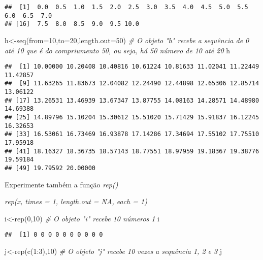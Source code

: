\documentclass[
]{book}
\newenvironment{Shaded}{\begin{snugshade}}{\end{snugshade}}
\newcommand{\AttributeTok}[1]{\textcolor[rgb]{0.77,0.63,0.00}{#1}}
\newcommand{\CommentTok}[1]{\textcolor[rgb]{0.56,0.35,0.01}{\textit{#1}}}
\newcommand{\DecValTok}[1]{\textcolor[rgb]{0.00,0.00,0.81}{#1}}
\newcommand{\FunctionTok}[1]{\textcolor[rgb]{0.00,0.00,0.00}{#1}}
\newcommand{\NormalTok}[1]{#1}
\newcommand{\OtherTok}[1]{\textcolor[rgb]{0.56,0.35,0.01}{#1}}
\newcommand{\SpecialCharTok}[1]{\textcolor[rgb]{0.00,0.00,0.00}{#1}}
\begin{document}
\begin{verbatim}
##  [1]  0.0  0.5  1.0  1.5  2.0  2.5  3.0  3.5  4.0  4.5  5.0  5.5  6.0  6.5  7.0
## [16]  7.5  8.0  8.5  9.0  9.5 10.0
\end{verbatim}

\begin{Shaded}
\begin{Highlighting}[]
\NormalTok{h}\OtherTok{\textless{}{-}}\FunctionTok{seq}\NormalTok{(}\AttributeTok{from=}\DecValTok{10}\NormalTok{,}\AttributeTok{to=}\DecValTok{20}\NormalTok{,}\AttributeTok{length.out=}\DecValTok{50}\NormalTok{) }\CommentTok{\# O objeto "h" recebe a sequência de 0 até 10 que é do compriumento 50, ou seja, há 50 número de 10 até 20}
\NormalTok{h}
\end{Highlighting}
\end{Shaded}

\begin{verbatim}
##  [1] 10.00000 10.20408 10.40816 10.61224 10.81633 11.02041 11.22449 11.42857
##  [9] 11.63265 11.83673 12.04082 12.24490 12.44898 12.65306 12.85714 13.06122
## [17] 13.26531 13.46939 13.67347 13.87755 14.08163 14.28571 14.48980 14.69388
## [25] 14.89796 15.10204 15.30612 15.51020 15.71429 15.91837 16.12245 16.32653
## [33] 16.53061 16.73469 16.93878 17.14286 17.34694 17.55102 17.75510 17.95918
## [41] 18.16327 18.36735 18.57143 18.77551 18.97959 19.18367 19.38776 19.59184
## [49] 19.79592 20.00000
\end{verbatim}

Experimente também a função \emph{rep()}

\emph{\emph{rep(x, times = 1, length.out = NA, each = 1)}}

\begin{Shaded}
\begin{Highlighting}[]
\NormalTok{i}\OtherTok{\textless{}{-}}\FunctionTok{rep}\NormalTok{(}\DecValTok{0}\NormalTok{,}\DecValTok{10}\NormalTok{) }\CommentTok{\# O objeto "i" recebe 10 números 1}
\NormalTok{i}
\end{Highlighting}
\end{Shaded}

\begin{verbatim}
##  [1] 0 0 0 0 0 0 0 0 0 0
\end{verbatim}

\begin{Shaded}
\begin{Highlighting}[]
\NormalTok{j}\OtherTok{\textless{}{-}}\FunctionTok{rep}\NormalTok{(}\FunctionTok{c}\NormalTok{(}\DecValTok{1}\SpecialCharTok{:}\DecValTok{3}\NormalTok{),}\DecValTok{10}\NormalTok{) }\CommentTok{\# O objeto "j" recebe 10 vezes a sequência 1, 2 e 3}
\NormalTok{j}
\end{Highlighting}
\end{Shaded}
\end{document}
